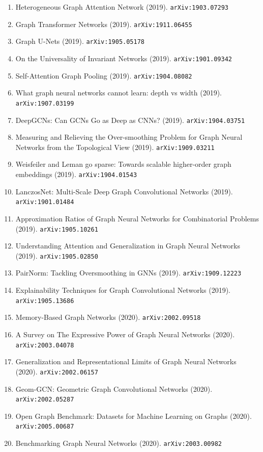 \documentclass[11pt]{article}
\begin{document}
\begin{enumerate}
  \item Heterogeneous Graph Attention Network (2019). \texttt{arXiv:1903.07293}
  \item Graph Transformer Networks (2019). \texttt{arXiv:1911.06455}
  \item Graph U-Nets (2019). \texttt{arXiv:1905.05178}
  \item On the Universality of Invariant Networks (2019). \texttt{arXiv:1901.09342}
  \item Self-Attention Graph Pooling (2019). \texttt{arXiv:1904.08082}
  \item What graph neural networks cannot learn: depth vs width (2019). \texttt{arXiv:1907.03199}
  \item DeepGCNs: Can GCNs Go as Deep as CNNs? (2019). \texttt{arXiv:1904.03751}
  \item Measuring and Relieving the Over-smoothing Problem for Graph Neural
  Networks from the Topological View (2019). \texttt{arXiv:1909.03211}
  \item Weisfeiler and Leman go sparse: Towards scalable higher-order graph
  embeddings (2019). \texttt{arXiv:1904.01543}
  \item LanczosNet: Multi-Scale Deep Graph Convolutional Networks (2019). \texttt{arXiv:1901.01484}
  \item Approximation Ratios of Graph Neural Networks for Combinatorial Problems (2019). \texttt{arXiv:1905.10261}
  \item Understanding Attention and Generalization in Graph Neural Networks (2019). \texttt{arXiv:1905.02850}
  \item PairNorm: Tackling Oversmoothing in GNNs (2019). \texttt{arXiv:1909.12223}
  \item Explainability Techniques for Graph Convolutional Networks (2019). \texttt{arXiv:1905.13686}
  \item Memory-Based Graph Networks (2020). \texttt{arXiv:2002.09518}
  \item A Survey on The Expressive Power of Graph Neural Networks (2020). \texttt{arXiv:2003.04078}
  \item Generalization and Representational Limits of Graph Neural Networks (2020). \texttt{arXiv:2002.06157}
  \item Geom-GCN: Geometric Graph Convolutional Networks (2020). \texttt{arXiv:2002.05287}
  \item Open Graph Benchmark: Datasets for Machine Learning on Graphs (2020). \texttt{arXiv:2005.00687}
  \item Benchmarking Graph Neural Networks (2020). \texttt{arXiv:2003.00982}

\end{enumerate}
\end{document}
